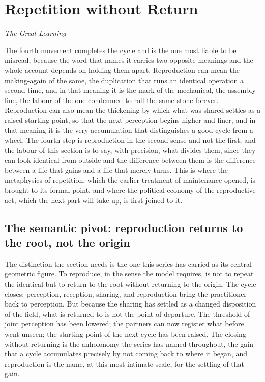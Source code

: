 \section{Repetition without Return}
\label{p22:sec:reproduction}

\epigraph{}{\textit{The Great Learning}}

\noindent
The fourth movement completes the cycle and is the one most liable to be misread, because the word that names it carries two opposite meanings and the whole account depends on holding them apart. Reproduction can mean the making-again of the same, the duplication that runs an identical operation a second time, and in that meaning it is the mark of the mechanical, the assembly line, the labour of the one condemned to roll the same stone forever. Reproduction can also mean the thickening by which what was shared settles as a raised starting point, so that the next perception begins higher and finer, and in that meaning it is the very accumulation that distinguishes a good cycle from a wheel. The fourth step is reproduction in the second sense and not the first, and the labour of this section is to say, with precision, what divides them, since they can look identical from outside and the difference between them is the difference between a life that gains and a life that merely turns. This is where the metaphysics of repetition, which the earlier treatment of maintenance opened, is brought to its formal point, and where the political economy of the reproductive act, which the next part will take up, is first joined to it.

\subsection{The semantic pivot: reproduction returns to the root, not the origin}
\label{p22:sub:reproduction-pivot}

The distinction the section needs is the one this series has carried as its central geometric figure. To reproduce, in the sense the model requires, is not to repeat the identical but to return to the root without returning to the origin. The cycle closes; perception, reception, sharing, and reproduction bring the practitioner back to perception. But because the sharing has settled as a changed disposition of the field, what is returned to is not the point of departure. The threshold of joint perception has been lowered; the partners can now register what before went unseen; the starting point of the next cycle has been raised. The closing-without-returning is the anholonomy the series has named throughout, the gain that a cycle accumulates precisely by not coming back to where it began, and reproduction is the name, at this most intimate scale, for the settling of that gain.


